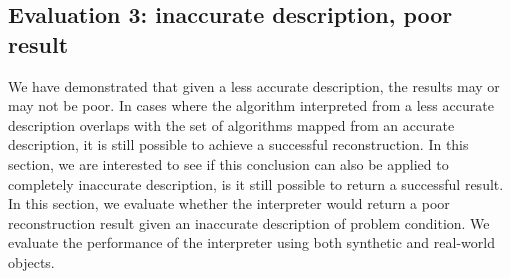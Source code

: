 

\subsection{Evaluation 3: inaccurate description, poor result}
We have demonstrated that given a less accurate description, the results may or may not be poor. In cases where the algorithm interpreted from a less accurate description overlaps with the set of algorithms mapped from an accurate description, it is still possible to achieve a successful reconstruction. In this section, we are interested to see if this conclusion can also be applied to completely inaccurate description, \ie is it still possible to return a successful result. In this section, we evaluate whether the interpreter would return a poor reconstruction result given an inaccurate description of problem condition. We evaluate the performance of the interpreter using both synthetic and real-world objects.

